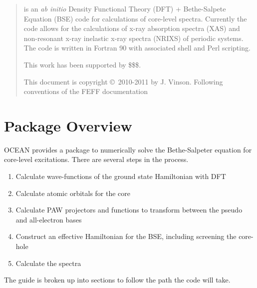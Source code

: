 \documentclass[11pt]{report}
\begin{document}
\MakeTitle

\newchapter{}
\begin{abstract}
\OCEAN{} is an {\it ab initio} Density Functional Theory (DFT) + Bethe-Salpete Equation (BSE) code for calculations of core-level spectra. Currently the code allows for the calculations of x-ray absorption spectra (XAS) and non-resonant x-ray inelastic x-ray spectra (NRIXS) of periodic systems. The code is written in Fortran 90 with associated shell and Perl scripting.

This work has been supported by \$\$\$.



 \noindent This document is copyright \copyright\ 2010-2011 by J. Vinson. Following conventions of the FEFF documentation

\end{abstract}

\newchapter{}
\tableofcontents
\newchapter{}

\setcounter{page}{1}


\chapter{Package Overview}



OCEAN provides a package to numerically solve the Bethe-Salpeter equation for core-level excitations. There are several steps in the process.
\begin{enumerate}
\item Calculate wave-functions of the ground state Hamiltonian with DFT
\item Calculate atomic orbitals for the core
\item Calculate PAW projectors and functions to transform between the pseudo and all-electron bases
\item Construct an effective Hamiltonian for the BSE, including screening the core-hole
\item Calculate the spectra
\end{enumerate}

The guide is broken up into sections to follow the path the code will take.
\end{document}
